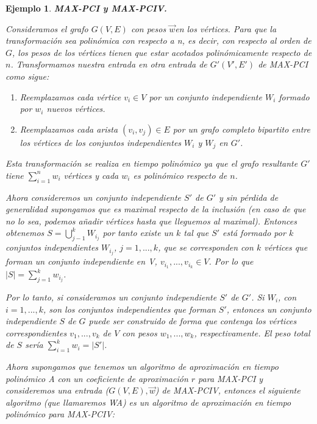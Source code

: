 \documentclass[a4paper,12pt,titlepage]{article}
\newtheorem{eje}{Ejemplo}[section]
\begin{document}
\begin{eje}

\textbf{MAX-PCI y MAX-PCIV.}\cite{red2}

Consideramos el grafo $G(V,E)$ con pesos $\overrightarrow{w}$en los v\'ertices. Para que la transformaci\'on sea polin\'omica con respecto a n, es decir, con respecto al orden de $G$, los pesos de los v\'ertices tienen que estar acotados polin\'omicamente respecto de $n$. Transformamos nuestra entrada en otra entrada de $G'(V',E')$ de MAX-PCI como sigue:

\begin{enumerate}
\item Reemplazamos cada v\'ertice $v_i\in V$ por un conjunto independiente $W_i$ formado por $w_i$ nuevos v\'ertices.
\item Reemplazamos cada arista $(v_i,v_j)\in E$ por un grafo completo bipartito entre los v\'ertices de los conjuntos independientes $W_i$ y $W_j$ en $G'$.
\end{enumerate}

Esta transformaci\'on se realiza en tiempo polin\'omico ya que el grafo resultante $G'$ tiene $\sum_{i=1}^{n} w_i$ v\'ertices y cada $w_i$ es polin\'omico respecto de $n$.

Ahora consideremos un conjunto independiente $S'$ de $G'$ y sin p\'erdida de generalidad supongamos que es maximal respecto de la inclusi\'on (en caso de que no lo sea, podemos añadir v\'ertices hasta que lleguemos al maximal). Entonces obtenemos $S=\bigcup_{j-1}^k W_{i_j}$ por tanto existe un $k$ tal que $S'$ est\'a formado por $k$ conjuntos independientes $W_{i_j}$, $j=1,...,k$, que se corresponden con $k$ v\'ertices que forman un conjunto independiente en V, $v_{i_1},...,v_{i_k}\in V$. Por lo que $|S|=\sum_{j=1}^k w_{i_j}$.

Por lo tanto, si consideramos un conjunto independiente $S'$ de $G'$. Si $W_i$, con $i=1,...,k$, son los conjuntos independientes que forman $S'$, entonces un conjunto independiente $S$ de $G$ puede ser construido de forma que contenga los v\'ertices correspondientes $v_1,...,v_k$ de $V$ con pesos $w_1,...,w_k$, respectivamente. El peso total de $S$ ser\'ia $\sum_{i=1}^k w_i=|S'|$.

Ahora supongamos que tenemos un algoritmo de aproximaci\'on en tiempo polin\'omico A con un coeficiente de aproximaci\'on $r$ para MAX-PCI y consideremos una entrada ($G(V,E),\overrightarrow{w}$) de MAX-PCIV, entonces el siguiente algoritmo (que llamaremos WA) es un algoritmo de aproximaci\'on en tiempo polin\'omico para MAX-PCIV:


\end{eje}
\end{document}
